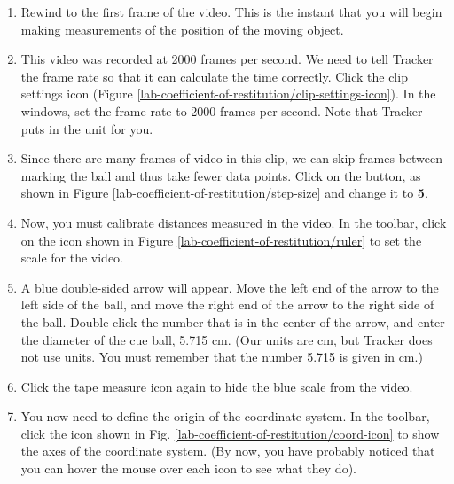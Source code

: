 \begin{enumerate}
	\item Rewind to the first frame of the video. This is the instant that you will begin making measurements of the position of the moving object.
	
	\item This video was recorded at 2000 frames per second. We need to tell Tracker the frame rate so that it can calculate the time correctly. Click the clip settings icon (Figure \ref{lab-coefficient-of-restitution/clip-settings-icon}). In the  windows, set the frame rate to 2000 frames per second. Note that Tracker puts in the unit for you.


	
	\item Since there are many frames of video in this clip, we can skip frames between marking the ball and thus take fewer data points. Click on the  button, as shown in Figure \ref{lab-coefficient-of-restitution/step-size} and change it to {\bf 5}.
	

	\item Now, you must calibrate distances measured in the video. In the toolbar, click on the  icon shown in Figure \ref{lab-coefficient-of-restitution/ruler} to set the scale for the video.
		

	\item A blue double-sided arrow will appear. Move the left end of the arrow to the left side of the ball, and move the right end of the arrow to the right side of the ball. Double-click the number that is in the center of the arrow, and enter the diameter of the cue ball, 5.715 cm. (Our units are cm, but Tracker does not use units. You must remember that the number 5.715 is given in cm.)
	
	\item Click the tape measure icon again to hide the blue scale from the video.
	
	\item You now need to define the origin of the coordinate system. In the toolbar, click the  icon shown in Fig. \ref{lab-coefficient-of-restitution/coord-icon} to show the axes of the coordinate system. (By now, you have probably noticed that you can hover the mouse over each icon to see what they do).
	

\end{enumerate}
